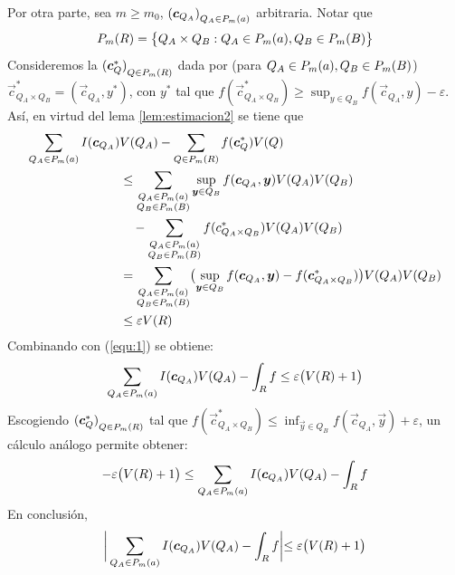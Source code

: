 \begin{demostracion}
Por otra parte, sea $ m \geq m_0 $, $ {(\boldsymbol{c}_{Q_A})}_{Q_A \in P_{m}(a)} $ \familiaEleccion{} arbitraria. Notar que
\[
    P_{m}(R) = \bigl\{ Q_A \times Q_B :
    Q_A \in P_{m}(a), Q_B \in P_{m}(B) \bigr\}
\]
Consideremos la \familiaEleccion{} $ {(\boldsymbol{c}_Q^*)}_{Q \in P_{m}(R)} $ dada por (para $ Q_A \in P_{m}(a), Q_B \in P_{m}(B) $) $ \vec{c}_{Q_A \times Q_B}^* = ( \vec{c}_{Q_A}, y^*) $, con $ y^* $ tal que $ f( \vec{c}_{Q_A \times Q_B}^*) \geq \sup_{y \in Q_B} f( \vec{c}_{Q_A}, y ) - \varepsilon $.
As\'i, en virtud del lema \ref{lem:estimacion2} se tiene que
\begin{align*}
    \sum_{Q_A \in P_{m}(a)} I( \boldsymbol{c}_{Q_A} ) &V(Q_A) - \sum_{Q \in
        P_{m}(R)} f( \boldsymbol{c}_Q^* ) V(Q) \\
    &\leq \sum_{\substack{ Q_A \in P_{m}(a) \\ Q_B \in P_{m}(B) }}
        \sup_{\boldsymbol{y} \in Q_B} f(\boldsymbol{c}_{Q_A}, \boldsymbol{y}) V(Q_A)V(Q_B) \\
    &\quad - \sum_{\substack{ Q_A \in P_{m}(a) \\ Q_B \in P_{m}(B) }}
        f(c_{Q_A \times Q_B}^*) V(Q_A)V(Q_B) \\
    &=  \sum_{\substack{ Q_A \in P_{m}(a) \\ Q_B \in P_{m}(B) }}
        \bigl( \sup_{\boldsymbol{y} \in Q_B} f(\boldsymbol{c}_{Q_A},\boldsymbol{y}) - f(\boldsymbol{c}_{Q_A \times Q_B}^*) \bigr)
        V(Q_A)V(Q_B) \\
    &\leq \varepsilon V(R)
\end{align*}
Combinando con (\ref{equ:1}) se obtiene:
\begin{align*}
    \sum_{Q_A \in P_{m}(a)} I( \boldsymbol{c}_{Q_A} ) V(Q_A) -
        \int_R f
    \leq \varepsilon \bigl(V(R) + 1\bigr)
\end{align*}
Escogiendo $ {(\boldsymbol{c}_Q^*)}_{Q \in P_{m}(R)} $ tal que $ f( \vec{c}_{Q_A
\times Q_B}^*) \leq \inf_{\vec{y} \in Q_B} f( \vec{c}_{Q_A}, \vec{y} ) + \varepsilon $,
un c\'alculo an\'alogo permite obtener:
\begin{align*}
    - \varepsilon \bigl(V(R) + 1\bigr)
    \leq \sum_{Q_A \in P_{m}(a)} I( \boldsymbol{c}_{Q_A} ) V(Q_A) -
        \int_R f
\end{align*}
En conclusi\'on,
\[
    \biggr\lvert \sum_{Q_A \in P_{m}(a)} I( \boldsymbol{c}_{Q_A} ) V(Q_A) -
        \int_R f \biggl\rvert
    \leq \varepsilon \bigl(V(R) + 1\bigr)
\]


\end{demostracion}
